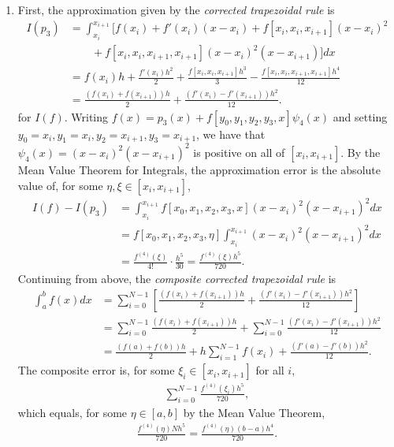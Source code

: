 \documentclass[a4paper,12pt]{article}
\begin{document}
\begin{enumerate}
    \item
        First, the approximation given by the \emph{corrected trapezoidal rule} is
        \begin{align*}
            I(p_3) &= \int_{x_i}^{x_{i + 1}} [ f(x_i) + f'(x_i)(x - x_i) + f[x_i, x_i, x_{i + 1}](x - x_i)^2 \\
            &\qquad+ f[x_i, x_i, x_{i + 1}, x_{i + 1}](x - x_i)^2(x - x_{i + 1}) ] dx \\
            &= f(x_i)h + \frac{f'(x_i) h^2}{2} + \frac{f[x_i, x_i, x_{i + 1}] h^3}{3} - \frac{f[x_i, x_i, x_{i + 1}, x_{i + 1}] h^4}{12} \\
            &= \frac{(f(x_i) + f(x_{i + 1}))h}{2} + \frac{(f'(x_i) - f'(x_{i + 1}))h^2}{12}.
        \end{align*}
        for $I(f)$. Writing $f(x) = p_3(x) + f[y_0, y_1, y_2, y_3, x] \psi_4(x)$ and setting $y_0 = x_i, y_1 = x_i, y_2 = x_{i + 1}, y_3 = x_{i + 1}$, we have that $\psi_4(x) = (x - x_i)^2 (x - x_{i + 1})^2$ is positive on all of $[x_i, x_{i + 1}]$. By the Mean Value Theorem for Integrals, the approximation error is the absolute value of, for some $\eta, \xi \in [x_i, x_{i + 1}]$,
        \begin{align*}
            I(f) - I(p_3) &= \int_{x_i}^{x_{i + 1}} f[x_0, x_1, x_2, x_3, x] (x - x_i)^2 (x - x_{i + 1})^2 dx \\
            &= f[x_0, x_1, x_2, x_3, \eta] \int_{x_i}^{x_{i + 1}} (x - x_i)^2 (x - x_{i + 1})^2 dx \\
            &= \frac{f^{(4)}(\xi)}{4!} \cdot \frac{h^5}{30}
            = \frac{f^{(4)}(\xi) h^5}{720}.
        \end{align*}
        Continuing from above, the \emph{composite corrected trapezoidal rule} is
        \begin{align*}
            \int_a^b f(x) dx &= \sum_{i = 0}^{N - 1} \left[ \frac{(f(x_i) + f(x_{i + 1}))h}{2} + \frac{(f'(x_i) - f'(x_{i + 1}))h^2}{12} \right] \\
            &= \sum_{i = 0}^{N - 1} \frac{(f(x_i) + f(x_{i + 1}))h}{2} + \sum_{i = 0}^{N - 1} \frac{(f'(x_i) - f'(x_{i + 1}))h^2}{12} \\
            &= \frac{(f(a) + f(b))h}{2} + h\sum_{i = 1}^{N - 1} f(x_i) + \frac{(f'(a) - f'(b))h^2}{12}.
        \end{align*}
        The composite error is, for some $\xi_i \in [x_i, x_{i + 1}]$ for all $i$,
        \begin{align*}
            \sum_{i = 0}^{N - 1} \frac{f^{(4)}(\xi_i) h^5}{720},
        \end{align*}
        which equals, for some $\eta \in [a, b]$ by the Mean Value Theorem,
        \begin{align*}
            \frac{f^{(4)}(\eta) Nh^5}{720} = \frac{f^{(4)}(\eta) (b - a) h^4}{720}.
        \end{align*}


\end{enumerate}
\end{document}
